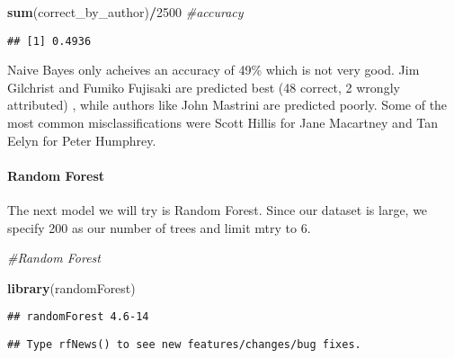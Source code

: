 \documentclass[]{article}
\newenvironment{Shaded}{\begin{snugshade}}{\end{snugshade}}
\newcommand{\KeywordTok}[1]{\textcolor[rgb]{0.13,0.29,0.53}{\textbf{#1}}}
\newcommand{\DecValTok}[1]{\textcolor[rgb]{0.00,0.00,0.81}{#1}}
\newcommand{\CommentTok}[1]{\textcolor[rgb]{0.56,0.35,0.01}{\textit{#1}}}
\newcommand{\OperatorTok}[1]{\textcolor[rgb]{0.81,0.36,0.00}{\textbf{#1}}}
\newcommand{\NormalTok}[1]{#1}
\let\oldparagraph\paragraph
\renewcommand{\paragraph}[1]{\oldparagraph{#1}\mbox{}}
\begin{document}
\begin{Shaded}
\begin{Highlighting}[]
\KeywordTok{sum}\NormalTok{(correct_by_author)}\OperatorTok{/}\DecValTok{2500} \CommentTok{#accuracy}
\end{Highlighting}
\end{Shaded}

\begin{verbatim}
## [1] 0.4936
\end{verbatim}

Naive Bayes only acheives an accuracy of 49\% which is not very good.
Jim Gilchrist and Fumiko Fujisaki are predicted best (48 correct, 2
wrongly attributed) , while authors like John Mastrini are predicted
poorly. Some of the most common misclassifications were Scott Hillis for
Jane Macartney and Tan Eelyn for Peter Humphrey.

\paragraph{Random Forest}\label{random-forest}

The next model we will try is Random Forest. Since our dataset is large,
we specify 200 as our number of trees and limit mtry to 6.

\begin{Shaded}
\begin{Highlighting}[]
\CommentTok{#Random Forest}

\KeywordTok{library}\NormalTok{(randomForest)}
\end{Highlighting}
\end{Shaded}

\begin{verbatim}
## randomForest 4.6-14
\end{verbatim}

\begin{verbatim}
## Type rfNews() to see new features/changes/bug fixes.
\end{verbatim}
\end{document}
